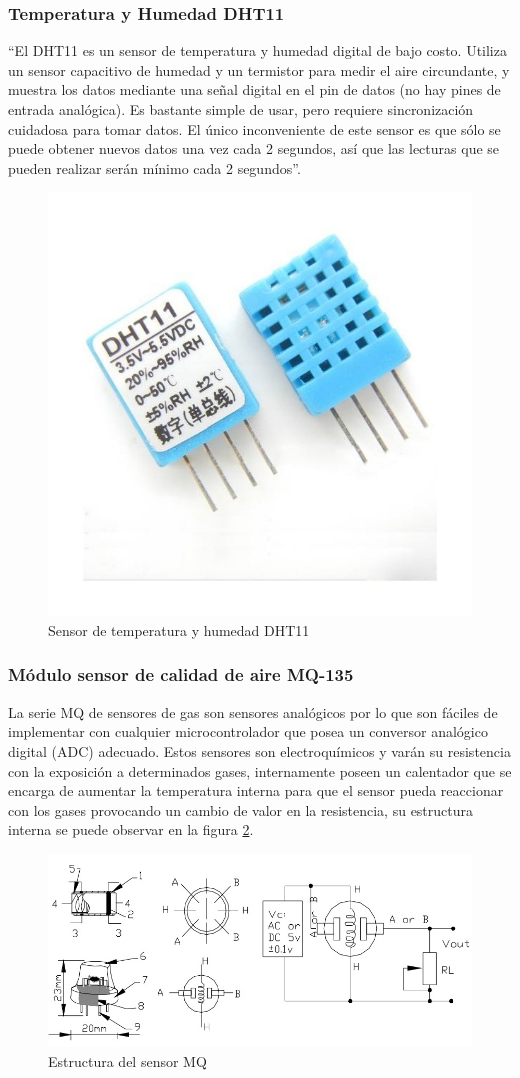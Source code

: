 \subsubsection{Temperatura y Humedad DHT11}

``El DHT11 es un sensor de temperatura y humedad digital de bajo costo. Utiliza un sensor capacitivo de humedad y un termistor para medir el aire circundante, y muestra los datos mediante una señal digital en el pin de datos (no hay pines de entrada analógica). Es bastante simple de usar, pero requiere sincronización cuidadosa para tomar datos. El único inconveniente de este sensor es que sólo se puede obtener nuevos datos una vez cada 2 segundos, así que las lecturas que se pueden realizar serán mínimo cada 2 segundos''. \cite{DHT11}

\begin{figure}
	\centering
	\caption{Sensor de temperatura y humedad DHT11 \cite{DHT11}}
	\label{fig:dht11}
	\includegraphics[width=0.4\linewidth]{Imagenes/dht11}
\end{figure}


\subsubsection{Módulo sensor de calidad de aire MQ-135}

La serie MQ de sensores de gas son sensores analógicos por lo que son fáciles de implementar con cualquier microcontrolador que posea un conversor analógico digital (ADC) adecuado. Estos sensores son electroquímicos y varán su resistencia con la exposición a determinados gases, internamente poseen un calentador que se encarga de aumentar la temperatura interna para que el sensor pueda reaccionar con los gases provocando un cambio de valor en la resistencia, su estructura interna se puede observar en la figura \ref{fig:estructura-del-sensor-mq}.\cite{MQ1}\\

\begin{figure}
	\centering
	\caption{Estructura del sensor MQ \cite{MQ1}}
	\label{fig:estructura-del-sensor-mq}
	\includegraphics[width=0.7\linewidth]{Imagenes/Estructura_del_sensor_MQ}
\end{figure}

